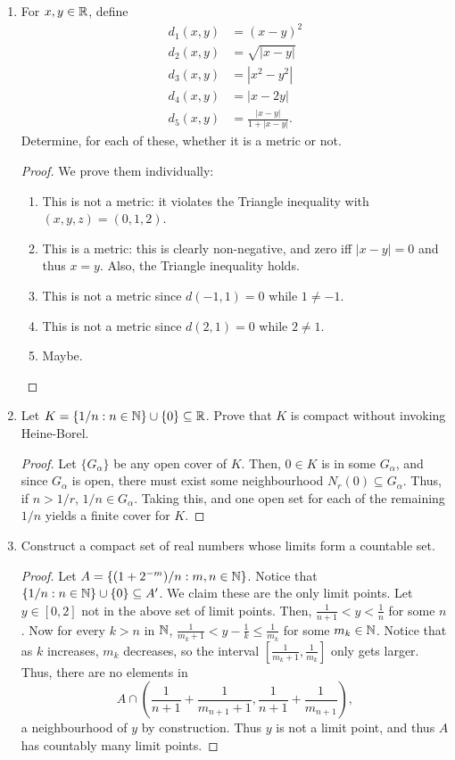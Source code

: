 \begin{enumerate}
\item %
For $x, y \in \mathbb{R}$, define
\begin{align*}
	d_1(x, y) &= (x - y)^2 \\
	d_2(x, y) &= \sqrt{|x - y|} \\
	d_3(x, y) &= |x^2 - y^2| \\
	d_4(x, y) &= |x - 2y| \\
	d_5(x, y) &= \frac{|x - y|}{1 + |x - y|}.
\end{align*}
Determine, for each of these, whether it is a metric or not.

\begin{proof}
We prove them individually:
\begin{enumerate}[${d}_1(x, y)$:]
\item This is not a metric: it violates the Triangle inequality with $(x, y, z) = (0, 1, 2)$.
\item This is a metric: this is clearly non-negative, and zero iff $|x - y| = 0$ and thus $x = y$. Also, the Triangle inequality holds.
\item This is not a metric since $d(-1, 1) = 0$ while $1 \ne -1$.
\item This is not a metric since $d(2, 1) = 0$ while $2 \ne 1$.
\item Maybe.
\end{enumerate}
\end{proof}

\item %
Let $K = \{1/n : n \in \mathbb{N}\} \cup \{0\} \subseteq \mathbb{R}$. Prove that $K$ is compact without invoking Heine-Borel.

\begin{proof}
Let $\{G_\alpha\}$ be any open cover of $K$. Then, $0 \in K$ is in some $G_\alpha$, and since $G_\alpha$ is open, there must exist some neighbourhood $N_r(0) \subseteq G_\alpha$. Thus, if $n > 1/r$, $1/n \in G_\alpha$. Taking this, and one open set for each of the remaining $1/n$ yields a finite cover for $K$.
\end{proof}

\item %
Construct a compact set of real numbers whose limits form a countable set.

\begin{proof}
Let $A = \{(1 + 2^{-m}) / n: m, n \in \mathbb{N}\}$. Notice that $\{1/n : n \in \mathbb{N}\} \cup \{0\} \subseteq A'$. We claim these are the only limit points. Let $y \in [0, 2]$ not in the above set of limit points. Then, $\frac{1}{n + 1} < y < \frac{1}{n}$ for some $n$. Now for every $k > n$ in $\mathbb{N}$, $\frac{1}{m_k + 1} < y - \frac{1}{k} \le \frac{1}{m_k}$ for some $m_k \in \mathbb{N}$. Notice that as $k$ increases, $m_k$ decreases, so the interval $\left[\frac{1}{m_k + 1}, \frac{1}{m_k}\right]$ only gets larger. Thus, there are no elements in 
\[
	A \cap \left( \frac{1}{n + 1} + \frac{1}{m_{n+1} + 1}, \frac{1}{n + 1} + \frac{1}{m_{n+1}} \right), 
\]
a neighbourhood of $y$ by construction. Thus $y$ is not a limit point, and thus $A$ has countably many limit points. 
\end{proof}


\end{enumerate}
